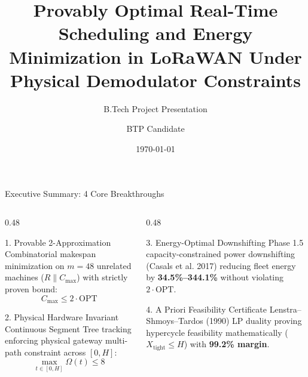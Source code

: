\documentclass[aspectratio=169,10pt]{beamer}
\title[Real-Time LoRaWAN Scheduling]{Provably Optimal Real-Time Scheduling and Energy Minimization in LoRaWAN Under Physical Demodulator Constraints}
\subtitle{B.Tech Project Presentation}
\author[Antigravity Research]{BTP Candidate}
\institute[BTP Project]{Department of Computer Science and Engineering}
\date{\today}
\begin{document}
\begin{frame}
  \titlepage
\end{frame}

\begin{frame}{Executive Summary: 4 Core Breakthroughs}
  \begin{columns}[T]
    \begin{column}{0.48\textwidth}
      \begin{block}{1. Provable 2-Approximation}
        Combinatorial makespan minimization on $m=48$ unrelated machines ($R \parallel C_{\max}$) with strictly proven bound:
        $$C_{\max} \le 2 \cdot \text{OPT}$$
      \end{block}
      \begin{block}{2. Physical Hardware Invariant}
        Continuous Segment Tree tracking enforcing physical gateway multi-path constraint across $[0, H]$:
        $$\max_{t \in [0, H]} \Omega(t) \le 8$$
      \end{block}
    \end{column}
    \begin{column}{0.48\textwidth}
      \begin{block}{3. Energy-Optimal Downshifting}
        Phase 1.5 capacity-constrained power downshifting (Casals et al. 2017) reducing fleet energy by \textbf{34.5\%--344.1\%} without violating $2 \cdot \text{OPT}$.
      \end{block}
      \begin{block}{4. A Priori Feasibility Certificate}
        Lenstra--Shmoys--Tardos (1990) LP duality proving hypercycle feasibility mathematically ($X_{\text{tight}} \le H$) with \textbf{99.2\% margin}.
      \end{block}
    \end{column}
  \end{columns}
\end{frame}
\end{document}
